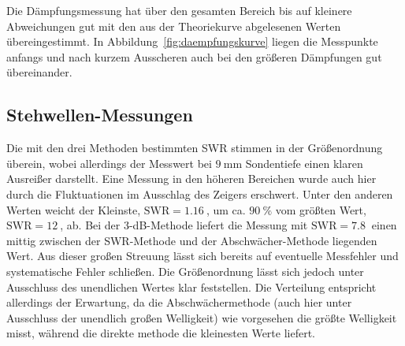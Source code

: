 Die Dämpfungsmessung hat über den gesamten Bereich bis auf kleinere Abweichungen gut mit den aus der Theoriekurve abgelesenen Werten übereingestimmt.
In Abbildung~\ref{fig:daempfungskurve} liegen die Messpunkte anfangs und nach kurzem Ausscheren auch bei den größeren Dämpfungen gut übereinander.

\subsection{Stehwellen-Messungen}

Die mit den drei Methoden bestimmten SWR stimmen in der Größenordnung überein, wobei allerdings der Messwert bei $\SI{9}{\milli\meter}$ Sondentiefe einen klaren Ausreißer darstellt.
Eine Messung in den höheren Bereichen wurde auch hier durch die Fluktuationen im Ausschlag des Zeigers erschwert.
Unter den anderen Werten weicht der Kleinste, $\text{SWR}=\SI{1.16}{}$, um ca. $\SI{90}{\percent}$ vom größten Wert, $\text{SWR}=\SI{12}{}$, ab.
Bei der 3-dB-Methode liefert die Messung mit $\text{SWR}=\SI{7.8}{}$ einen mittig zwischen der SWR-Methode und der Abschwächer-Methode liegenden Wert.
Aus dieser großen Streuung lässt sich bereits auf eventuelle Messfehler und systematische Fehler schließen. 
Die Größenordnung lässt sich jedoch unter Ausschluss des unendlichen Wertes klar feststellen.
Die Verteilung entspricht allerdings der Erwartung, da die Abschwächermethode (auch hier unter Ausschluss der unendlich großen Welligkeit) wie vorgesehen die größte Welligkeit misst, während die direkte methode die kleinesten Werte liefert.
